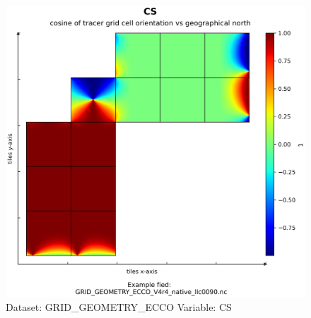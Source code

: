 \begin{figure}[H]
\centering
\includegraphics[scale=0.55]{../images/plots/native_plots_coords/Geometry_Parameters_for_the_Lat-Lon-Cap_90_(llc90)_Native_Model_Grid_(Version_4_Release_4)/CS.png}
\caption{Dataset: GRID\_GEOMETRY\_ECCO Variable: CS}
\label{tab:table-GRID_GEOMETRY_ECCO_CS-Plot}
\end{figure}
\pagebreak
